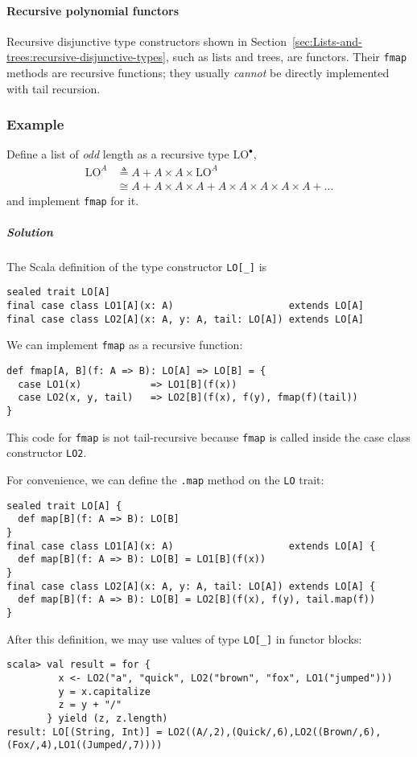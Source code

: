 \paragraph{Recursive polynomial functors}

Recursive disjunctive type constructors shown in Section~\ref{sec:Lists-and-trees:recursive-disjunctive-types},
such as lists and trees, are functors. Their \lstinline!fmap! methods
are recursive functions; they usually \emph{cannot} be directly implemented
with tail recursion. 

\subsubsection{Example }

Define a list of \emph{odd} length as a recursive type $\text{LO}^{\bullet}$,
\begin{align}
\text{LO}^{A} & \triangleq A+A\times A\times\text{LO}^{A}\label{eq:f-lo-def}\\
 & \cong A+A\times A\times A+A\times A\times A\times A\times A+...\nonumber 
\end{align}
and implement \lstinline!fmap! for it.

\subparagraph{Solution}

The Scala definition of the type constructor \lstinline!LO[_]! is

\begin{lstlisting}
sealed trait LO[A]
final case class LO1[A](x: A)                    extends LO[A]
final case class LO2[A](x: A, y: A, tail: LO[A]) extends LO[A]
\end{lstlisting}

We can implement \lstinline!fmap! as a recursive function:
\begin{lstlisting}
def fmap[A, B](f: A => B): LO[A] => LO[B] = {
  case LO1(x)            => LO1[B](f(x))
  case LO2(x, y, tail)   => LO2[B](f(x), f(y), fmap(f)(tail))
}
\end{lstlisting}
This code for \lstinline!fmap! is not tail-recursive because \lstinline!fmap!
is called inside the case class constructor \lstinline!LO2!. 

For convenience, we can define the \lstinline!.map! method on the
\lstinline!LO! trait:
\begin{lstlisting}
sealed trait LO[A] {
  def map[B](f: A => B): LO[B]
}
final case class LO1[A](x: A)                    extends LO[A] {
  def map[B](f: A => B): LO[B] = LO1[B](f(x))
}
final case class LO2[A](x: A, y: A, tail: LO[A]) extends LO[A] {
  def map[B](f: A => B): LO[B] = LO2[B](f(x), f(y), tail.map(f))
}
\end{lstlisting}
After this definition, we may use values of type \lstinline!LO[_]!
in functor blocks:
\begin{lstlisting}
scala> val result = for {
         x <- LO2("a", "quick", LO2("brown", "fox", LO1("jumped")))
         y = x.capitalize
         z = y + "/"
       } yield (z, z.length)
result: LO[(String, Int)] = LO2((A/,2),(Quick/,6),LO2((Brown/,6),(Fox/,4),LO1((Jumped/,7))))
\end{lstlisting}

